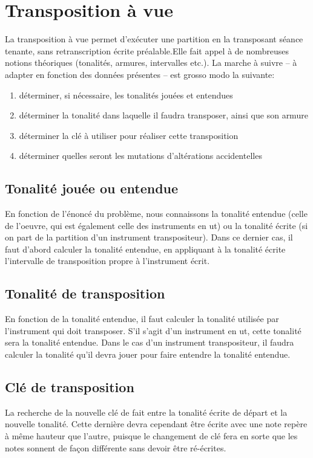 \documentclass[11pt]{scrreprt}
\begin{document}
\section{Transposition à vue}\label{transpovue}
La transposition à vue permet d'exécuter une partition en la transposant séance tenante, sans retranscription écrite préalable.Elle fait appel à de nombreuses notions théoriques (tonalités, armures, intervalles etc.). La marche à suivre -- à adapter en fonction des données présentes -- est grosso modo la suivante:
\begin{enumerate}
\item déterminer, si nécessaire, les tonalités jouées et entendues
\item déterminer la tonalité dans laquelle il faudra transposer, ainsi que son armure
\item déterminer la clé à utiliser pour réaliser cette transposition
\item déterminer quelles seront les mutations d'altérations accidentelles
\end{enumerate}
\subsection{Tonalité jouée ou entendue}
En fonction de l'énoncé du problème, nous connaissons la tonalité entendue (celle de l'oeuvre, qui est également celle des instruments en ut) ou la tonalité écrite (si on part de la partition d'un instrument transpositeur). Dans ce dernier cas, il faut d'abord calculer la tonalité entendue, en appliquant à la tonalité écrite l'intervalle de transposition propre à l'instrument écrit.

\subsection{Tonalité de transposition}
En fonction de la tonalité entendue, il faut calculer la tonalité utilisée par l'instrument qui doit transposer. S'il s'agit d'un instrument en ut, cette tonalité sera la tonalité entendue. Dans le cas d'un instrument transpositeur, il faudra calculer la tonalité qu'il devra jouer pour faire entendre la tonalité entendue.

\subsection{Clé de transposition}
La recherche de la nouvelle clé de fait entre la tonalité écrite de départ et la nouvelle tonalité. Cette dernière devra cependant être écrite avec une note repère à même hauteur que l'autre, puisque le changement de clé fera en sorte que les notes sonnent de façon différente sans devoir être ré-écrites.
\end{document}

